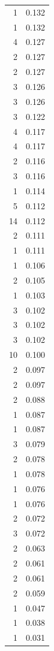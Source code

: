 \begin{tabular}{rr}
1 & 0.132 \\
1 & 0.132 \\
4 & 0.127 \\
2 & 0.127 \\
2 & 0.127 \\
3 & 0.126 \\
3 & 0.126 \\
3 & 0.122 \\
4 & 0.117 \\
4 & 0.117 \\
2 & 0.116 \\
3 & 0.116 \\
1 & 0.114 \\
5 & 0.112 \\
14 & 0.112 \\
2 & 0.111 \\
1 & 0.111 \\
1 & 0.106 \\
2 & 0.105 \\
1 & 0.103 \\
3 & 0.102 \\
3 & 0.102 \\
3 & 0.102 \\
10 & 0.100 \\
2 & 0.097 \\
2 & 0.097 \\
2 & 0.088 \\
1 & 0.087 \\
1 & 0.087 \\
3 & 0.079 \\
2 & 0.078 \\
1 & 0.078 \\
1 & 0.076 \\
1 & 0.076 \\
2 & 0.072 \\
3 & 0.072 \\
2 & 0.063 \\
2 & 0.061 \\
2 & 0.061 \\
2 & 0.059 \\
1 & 0.047 \\
1 & 0.038 \\
1 & 0.031 \\
\bottomrule
\end{tabular}
